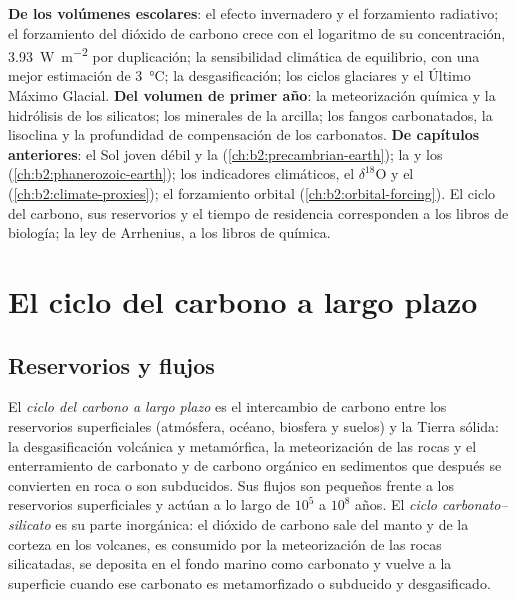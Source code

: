 \begin{recall}
\textbf{De los volúmenes escolares}: el efecto invernadero y el forzamiento radiativo; el forzamiento del
dióxido de carbono crece con el logaritmo de su concentración, \qty{3.93}{W.m^{-2}} por duplicación;
la sensibilidad climática de equilibrio, con una mejor estimación de \qty{3}{\celsius}; la desgasificación; los ciclos glaciares
y el Último Máximo Glacial. \textbf{Del volumen de primer año}: la meteorización química y la
hidrólisis de los silicatos; los minerales de la arcilla; los fangos carbonatados, la lisoclina y la profundidad
de compensación de los carbonatos. \textbf{De capítulos anteriores}: el Sol joven débil y la 
(\cref{ch:b2:precambrian-earth}); la  y los 
(\cref{ch:b2:phanerozoic-earth}); los indicadores climáticos, el $\delta^{18}$O y el 
(\cref{ch:b2:climate-proxies}); el forzamiento orbital (\cref{ch:b2:orbital-forcing}). El ciclo del carbono,
sus reservorios y el tiempo de residencia corresponden a los libros de biología; la ley de Arrhenius, a los
libros de química.
\end{recall}

\section{El ciclo del carbono a largo plazo}\label{sec:b2:deep-time-climate:cycle}

\subsection*{Reservorios y flujos}

\begin{definition}\label{def:b2:deep-time-climate:carbon-cycle}
El \emph{ciclo del carbono a largo plazo} es el intercambio de carbono entre
los reservorios superficiales (atmósfera, océano, biosfera y suelos) y la Tierra sólida: la desgasificación volcánica y
metamórfica, la meteorización de las rocas y el enterramiento de carbonato y de carbono orgánico en
sedimentos que después se convierten en roca o son subducidos. Sus flujos son pequeños frente a los reservorios
superficiales y actúan a lo largo de $10^5$ a $10^8$ años. El \emph{ciclo
carbonato--silicato} es su parte inorgánica: el dióxido de carbono sale del manto
y de la corteza en los volcanes, es consumido por la meteorización de las rocas silicatadas, se deposita en el
fondo marino como carbonato y vuelve a la superficie cuando ese carbonato es metamorfizado o
subducido y desgasificado.
\end{definition}

